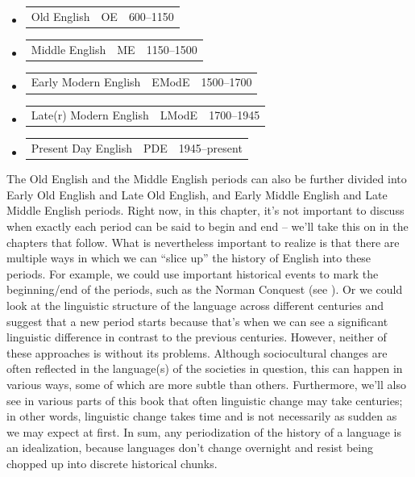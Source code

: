 \begin{itemize}
    \item \begin{tabular}{p{4cm}p{2cm}l}
    Old English & OE & 600--1150\end{tabular}
    \item \begin{tabular}{p{4cm}p{2cm}l} 
    Middle English & ME & 1150--1500\end{tabular}
    \item \begin{tabular}{p{4cm}p{2cm}l} 
    Early Modern English & EModE & 1500--1700\end{tabular}
    \item \begin{tabular}{p{4cm}p{2cm}l} 
    Late(r) Modern English & LModE & 1700--1945\end{tabular}
    \item \begin{tabular}{p{4cm}p{2cm}l} 
    Present Day English & PDE & 1945--present\end{tabular}
\end{itemize}

\noindent The Old English and the Middle English periods can also be further divided into Early Old English and Late Old English, and Early Middle English and Late Middle English periods. Right now, in this chapter, it's not important to discuss when exactly each period can be said to begin and end -- we'll take this on in the chapters that follow. What is nevertheless important to realize is that there are multiple ways in which we can ``slice up'' the history of English into these periods. For example, we could use important historical events to mark the beginning/end of the periods, such as the Norman Conquest (see ). Or we could look at the linguistic structure of the language across different centuries and suggest that a new period starts because that's when we can see a significant linguistic difference in contrast to the previous centuries. However, neither of these approaches is without its problems. Although sociocultural changes are often reflected in the language(s) of the societies in question, this can happen in various ways, some of which are more subtle than others. Furthermore, we'll also see in various parts of this book that often linguistic change may take centuries; in other words, linguistic change takes time and is not necessarily as sudden as we may expect at first. In sum, any periodization of the history of a language is an idealization, because languages don't change overnight and resist being chopped up into discrete historical chunks.

